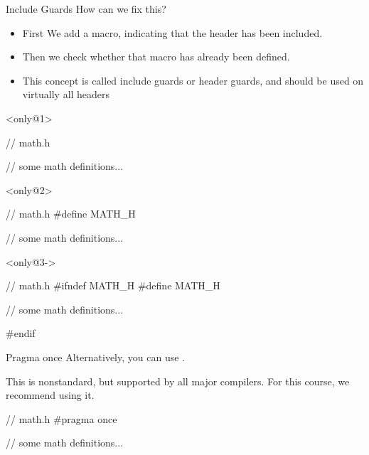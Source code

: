 \documentclass[10pt,graphics,aspectratio=169,table]{beamer}
\begin{document}
\begin{frame}[fragile]{Include Guards}
    How can we fix this?
    \begin{itemize}
        \item<2-> First We add a macro, indicating that the header has been included.
        \item<3-> Then we check whether that macro has already been defined.
        \item<4-> This concept is called include guards or header guards, and should
            be used on virtually all headers
    \end{itemize}
    \begin{block}<only@1>{}
        \begin{codeblock}
// math.h

// some math definitions...
        \end{codeblock}
    \end{block}

    \begin{block}<only@2>{}
        \begin{codeblock}
// math.h
#define MATH_H

// some math definitions...
        \end{codeblock}
    \end{block}

    \begin{block}<only@3->{}
        \begin{codeblock}
// math.h
#ifndef MATH_H
#define MATH_H

// some math definitions...

#endif
        \end{codeblock}
    \end{block}
\end{frame}

\begin{frame}[fragile]{Pragma once}
    Alternatively, you can use .
    
    This is nonstandard, but supported by all major compilers.
    For this course, we recommend using it.
    
    \begin{codeblock}
// math.h
#pragma once

// some math definitions...
    \end{codeblock}
\end{frame}
\end{document}
